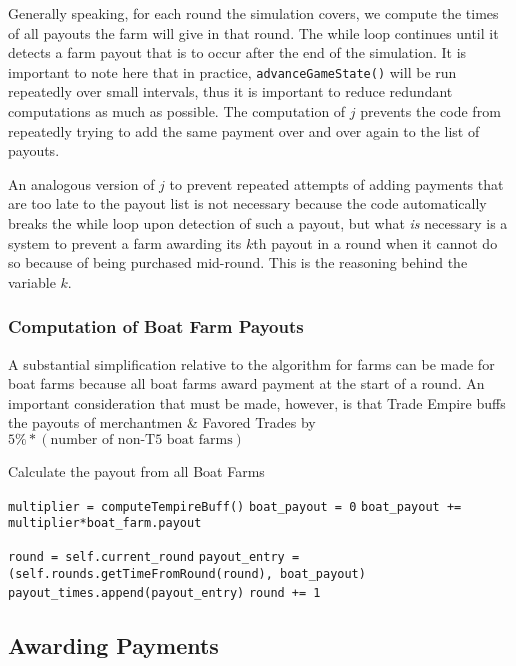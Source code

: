 \documentclass[12pt,letterpaper]{article}
\theoremstyle{remark}
\theoremstyle{plain}
\begin{document}
Generally speaking, for each round the simulation covers, we compute the times of all payouts the farm will give in that round. The while loop continues until it detects a farm payout that is to occur after the end of the simulation. It is important to note here that in practice, \texttt{advanceGameState()} will be run repeatedly over small intervals, thus it is important to reduce redundant computations as much as possible. The computation of $j$ prevents the code from repeatedly trying to add the same payment over and over again to the list of payouts. 

An analogous version of $j$ to prevent repeated attempts of adding payments that are too late to the payout list is not necessary because the code automatically breaks the while loop upon detection of such a payout, but what \textit{is} necessary is a system to prevent a farm awarding its $k$th payout in a round when it cannot do so because of being purchased mid-round. This is the reasoning behind the variable $k$. 

\subsubsection{Computation of Boat Farm Payouts}

A substantial simplification relative to the algorithm for farms can be made for boat farms because all boat farms award payment at the start of a round. An important consideration that must be made, however, is that Trade Empire buffs the payouts of merchantmen \& Favored Trades by $5\%*(\text{number of non-T5 boat farms})$

\begin{algorithm}
\caption{Calculate the payout from all Boat Farms}
\begin{algorithmic}
\State \texttt{multiplier = computeTempireBuff()}
\State \texttt{boat\_payout = 0}
    \State \texttt{boat\_payout += multiplier*boat\_farm.payout}
\EndFor

\State \texttt{round = self.current\_round}
    \State \texttt{payout\_entry = (self.rounds.getTimeFromRound(round), boat\_payout)}
    \State \texttt{payout\_times.append(payout\_entry)}   
    \State \texttt{round += 1}
\EndWhile
\end{algorithmic}
\end{algorithm}

\subsection{Awarding Payments}\label{awarding payments}
\end{document}

